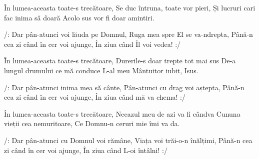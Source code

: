 \beginverse
În lumea-aceasta toate-s trecătoare,
Se duc întruna, toate vor pieri,
Și lucruri cari fac inima să doară
Acolo sus vor fi doar amintiri.
\endverse

\beginchorus
/: Dar pân-atunci voi lăuda pe Domnul,
Ruga mea spre El se va-ndrepta,
Până-n cea zi când în cer voi ajunge,
În ziua când Îl voi vedea! :/
\endchorus

\beginverse
În lumea-aceasta toate-s trecătoare,
Durerile-s doar trepte tot mai sus
De-a lungul drumului ce mă conduce
L-al meu Mântuitor iubit, Isus.
\endverse

\beginchorus
/: Dar pân-atunci inima mea să cânte,
Pân-atunci cu drag voi aștepta,
Până-n cea zi când în cer voi ajunge,
În ziua când mă va chema! :/
\endchorus

\beginverse
În lumea-aceasta toate-s trecătoare,
Necazul meu de azi va fi cândva
Cununa vieții cea nemuritoare,
Ce Domnu-n ceruri mie îmi va da.
\endverse

\beginchorus
/: Dar pân-atunci cu Domnul voi rămâne,
Viața voi trăi-o-n înălțimi,
Până-n cea zi când în cer voi ajunge,
În ziua când L-oi întâlni! :/
\endchorus
\endsong